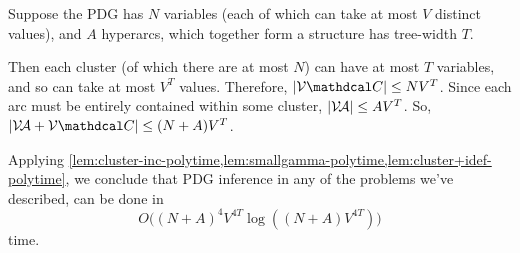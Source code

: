 \documentclass{article}
\begin{document}
\begin{lproof}\label{proof:main}
    Suppose the PDG has $N$ variables 
    (each of which can take at most $V$ distinct values), 
    and $A$ hyperarcs, which together form a structure has tree-width $T$. 
    
    Then each cluster (of which there are at most $N$) 
    can have at most $T$ variables, and so can take at most $V^T$ values.
    Therefore, $|\V \mathdcal C| \le N V^T$.
    Since each arc must be entirely contained within some cluster, 
    $|\mathcal V\!\mathcal A| \le A V^T$. 
    So, $|\V\!\Ar + \V \mathdcal C| \le (N+A) V^T$. 
    
    Applying \cref{lem:cluster-inc-polytime,lem:smallgamma-polytime,lem:cluster+idef-polytime}, we conclude that PDG inference in any of the problems we've described, can be done in
    \[
        O\Big(  (N+A)^4 V^{4T} \log ((N+A) V^{4T}) \Big)
    \]
    time.
\end{lproof}

\subsection{}
\end{document}
